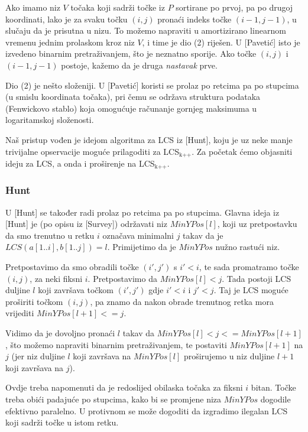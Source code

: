 \documentclass[11pt]{article}
\begin{document}
Ako imamo niz $V$ točaka koji sadrži točke iz $P$ sortirane po prvoj,
pa po drugoj koordinati, lako je za svaku točku $(i, j)$ pronaći indeks
točke $(i-1, j-1)$, u slučaju da je prisutna u nizu. To možemo napraviti
u amortizirano linearnom vremenu jednim prolaskom kroz niz $V$, i time
je dio (2) riješen. U [Pavetić] isto je izvedeno binarnim pretraživanjem,
što je neznatno sporije. Ako točke $(i, j)$ i $(i-1, j-1)$ postoje,
kažemo da je druga \emph{nastavak} prve.

Dio (2) je nešto složeniji. U [Pavetić] koristi se prolaz po retcima
pa po stupcima (u smislu koordinata točaka), pri čemu se održava
struktura podataka (Fenwickovo stablo) koja omogućuje računanje gornjeg
maksimuma u logaritamskoj složenosti. 

Naš pristup vođen je idejom algoritma za LCS iz [Hunt], koju je uz neke
manje trivijalne opservacije moguće prilagoditi za LCS$_{\text{k++}}$. Za početak
ćemo objasniti ideju za LCS, a onda i proširenje na LCS$_{\text{k++}}$.

\subsubsection{Hunt}
\label{sec-2-2-1}
U [Hunt] se također radi prolaz po retcima pa po stupcima.  Glavna
ideja iz [Hunt] je (po opisu iz [Survey]) održavati niz
$MinYPos[l]$, koji uz pretpostavku da smo trenutno u retku $i$
označava minimalni $j$ takav da je $LCS(a[1..i], b[1..j]) =
    l$. Primijetimo da je $MinYPos$ nužno rastući niz.

Pretpostavimo da smo obradili točke $(i', j')$ s $i' < i$, te sada
promatramo točke $(i, j)$, za neki fiksni $i$. Pretpostavimo da
$MinYPos[l] < j$.  Tada postoji LCS duljine $l$ koji završava točkom
$(i', j')$ gdje $i' < i$ i $j' < j$. Taj je LCS moguće proširiti točkom
$(i, j)$, pa znamo da nakon obrade trenutnog retka mora vrijediti
$MinYPos[l+1] <= j$.  

Vidimo da je dovoljno pronaći $l$ takav da $MinYPos[l] < j <=
    MinYPos[l+1]$, što možemo napraviti binarnim pretraživanjem, te
postaviti $MinYPos[l+1]$ na $j$ (jer niz duljine $l$ koji završava
na $MinYPos[l]$ proširujemo u niz duljine $l+1$ koji završava na
$j$).

Ovdje treba napomenuti da je redoslijed obilaska točaka za fiksni $i$
bitan. Točke treba obići padajuće po stupcima, kako bi se promjene
niza $MinYPos$ dogodile efektivno paralelno. U protivnom se može
dogoditi da izgradimo ilegalan LCS koji sadrži točke u istom
retku.
\end{document}
